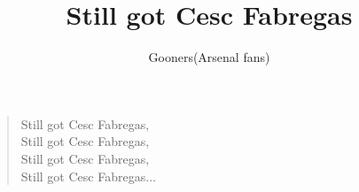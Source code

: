 \documentclass[a4paper,12pt]{article}
\title{Still got Cesc Fabregas}
\author{Gooners(Arsenal fans)}
\date{}
\begin{document}
	
	\maketitle
	
	\begin{verse}
		
		Still got Cesc Fabregas, \\
		Still got Cesc Fabregas, \\
		Still got Cesc Fabregas, \\
		Still got Cesc Fabregas$\ldots$
		
	\end{verse}
	
\end{document}
